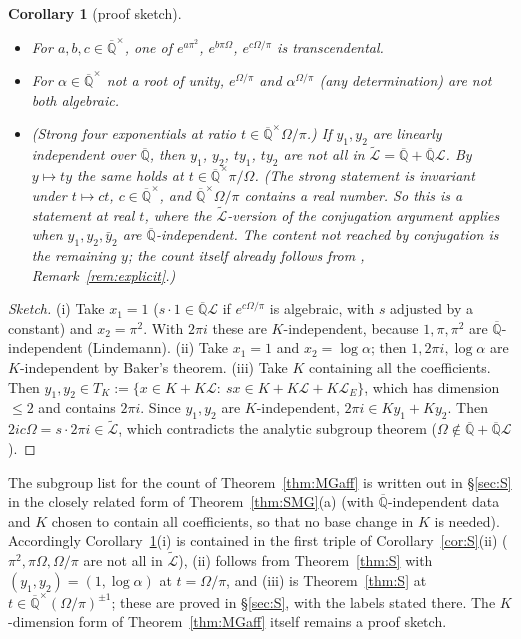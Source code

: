 \documentclass[11pt]{amsart}
\newtheorem{corollary}[theorem]{Corollary}
\theoremstyle{definition}
\newcommand{\Qb}{\overline{\mathbb{Q}}}
\newcommand{\Lg}{\mathcal{L}}
\newcommand{\Lt}{\widetilde{\mathcal{L}}}
\begin{document}
\begin{corollary}[proof sketch]\label{cor:MGaff}
\begin{itemize}
\item[(i)] For $a,b,c\in\Qb^\times$, one of $e^{a\pi^2}$, $e^{b\pi\Omega}$, $e^{c\Omega/\pi}$ is transcendental.
\item[(ii)] For $\alpha\in\Qb^\times$ not a root of unity, $e^{\Omega/\pi}$ and $\alpha^{\Omega/\pi}$ (any determination) are not
both algebraic.
\item[(iii)] (Strong four exponentials at ratio $t\in\Qb^\times\Omega/\pi$.) If $y_1,y_2$ are linearly independent over
$\Qb$, then $y_1$, $y_2$, $ty_1$, $ty_2$ are not all in $\Lt=\Qb+\Qb\Lg$. By $y\mapsto ty$ the same holds at
$t\in\Qb^\times\pi/\Omega$. (The strong statement is invariant under $t\mapsto ct$, $c\in\Qb^\times$, and $\Qb^\times\Omega/\pi$ contains
a real number. So this is a statement at real $t$, where the $\Lt$-version of the conjugation argument
\cite[Thm.~4.1]{W07} applies when $y_1,y_2,\bar y_2$ are $\Qb$-independent. The content not reached by conjugation is the remaining $y$;
the count itself already follows from \cite[Th\'eor\`eme (iii)]{RW93}, Remark~\ref{rem:explicit}.)
\end{itemize}
\end{corollary}

\begin{proof}[Sketch]
(i) Take $x_1=1$ ($s\cdot1\in\Qb\Lg$ if $e^{c\Omega/\pi}$ is algebraic, with $s$ adjusted by a constant) and $x_2=\pi^2$. With $2\pi i$
these are $K$-independent, because $1,\pi,\pi^2$ are $\Qb$-independent (Lindemann). (ii) Take $x_1=1$ and $x_2=\log\alpha$;
then $1,2\pi i,\log\alpha$ are $K$-independent by Baker's theorem. (iii) Take $K$ containing all the coefficients. Then
$y_1,y_2\in T_K:=\{x\in K+K\Lg:\ sx\in K+K\Lg+K\Lg_E\}$, which has dimension $\le2$ and contains $2\pi i$. Since $y_1,y_2$ are
$K$-independent, $2\pi i\in Ky_1+Ky_2$. Then $2ic\Omega=s\cdot2\pi i\in\Lt$, which contradicts the analytic subgroup theorem
($\Omega\notin\Qb+\Qb\Lg$).
\end{proof}

\noindent The subgroup list for the count of Theorem~\ref{thm:MGaff} is written out in \S\ref{sec:S} in the closely related
form of Theorem~\ref{thm:SMG}(a) (with $\Qb$-independent data and $K$ chosen to contain all coefficients, so that no base
change in $K$ is needed). Accordingly Corollary~\ref{cor:MGaff}(i) is contained in the first triple of
Corollary~\ref{cor:S}(ii) ($\pi^2,\pi\Omega,\Omega/\pi$ are not all in $\Lt$), (ii) follows from Theorem~\ref{thm:S} with
$(y_1,y_2)=(1,\log\alpha)$ at $t=\Omega/\pi$, and (iii) is Theorem~\ref{thm:S} at $t\in\Qb^\times(\Omega/\pi)^{\pm1}$; these
are proved in \S\ref{sec:S}, with the labels stated there. The $K$-dimension form of Theorem~\ref{thm:MGaff} itself remains a
proof sketch.
\end{document}
